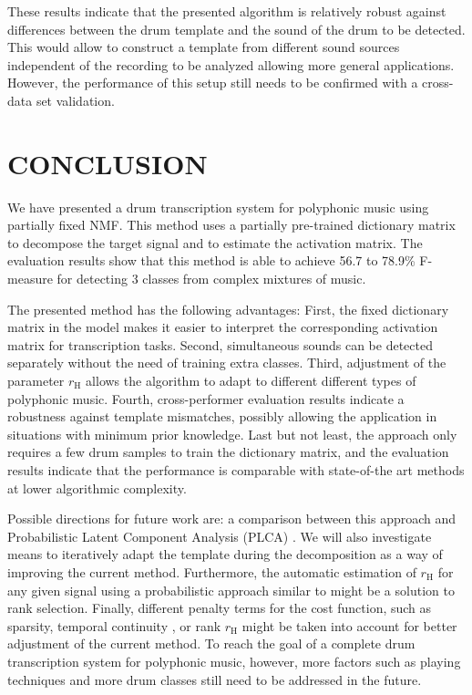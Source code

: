 \documentclass{article}
\begin{document}
These results indicate that the presented algorithm is relatively robust against differences between the drum template and the sound of the drum to be detected. This would allow to construct a template from different sound sources independent of the recording to be analyzed allowing more general applications. However, the performance of this setup still needs to be confirmed with a cross-data set validation.

\section{CONCLUSION}\label{sec:Conclusion}

We have presented a drum transcription system for polyphonic music using partially fixed NMF. This method uses a partially pre-trained dictionary matrix to decompose the target signal and to estimate the activation matrix. The evaluation results show that this method is able to achieve 56.7 to 78.9\% F-measure for detecting 3 classes from complex mixtures of music. 

The presented method has the following advantages: 
First, the fixed dictionary matrix in the model makes it easier to interpret the corresponding activation matrix for transcription tasks.
Second, simultaneous sounds can be detected separately without the need of training extra classes.  
Third, adjustment of the parameter $r_\mathrm{H}$ allows the algorithm to adapt to different different types of polyphonic music. 
Fourth, cross-performer evaluation results indicate a robustness against template mismatches, possibly allowing the application in situations with minimum prior knowledge. 
Last but not least, the approach only requires a few drum samples to train the dictionary matrix, and the evaluation results indicate that the performance is comparable with state-of-the art methods at lower algorithmic complexity. 

Possible directions for future work are: 
a comparison between this approach and Probabilistic Latent Component Analysis (PLCA) \cite{smaragdis_plca_2014}. We will also investigate means to iteratively adapt the template during the decomposition as a way of improving the current method. %
Furthermore, the automatic estimation of $r_\mathrm{H}$ for any given signal using a probabilistic approach similar to  \cite{ouo_inmf_2010} might be a solution to rank selection. Finally, different penalty terms for the cost function, such as sparsity, temporal continuity \cite{Virtanen_ssnmf_2007}, or rank $r_\mathrm{H}$ might be taken into account for better adjustment of the current method. To reach the goal of a complete drum transcription system for polyphonic music, however, more factors such as playing techniques and more drum classes still need to be addressed in the future. 
\end{document}
